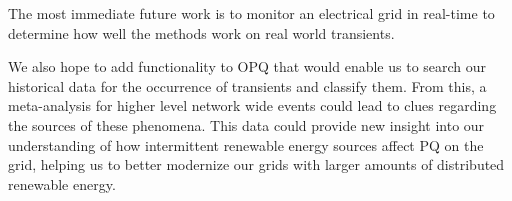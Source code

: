 \documentclass[10pt, conference, compsocconf]{IEEEtran}
\begin{document}
The most immediate future work is to monitor an electrical grid in real-time to determine how well the methods work on real world transients.

We also hope to add functionality to OPQ that would enable us to search our historical data for the occurrence of transients and classify them. From this, a meta-analysis for higher level network wide events could lead to clues regarding the sources of these phenomena. This data could provide new insight into our understanding of how intermittent renewable energy sources affect PQ on the grid, helping us to better modernize our grids with larger amounts of distributed renewable energy.





%
%
%
%
%




\end{document}
